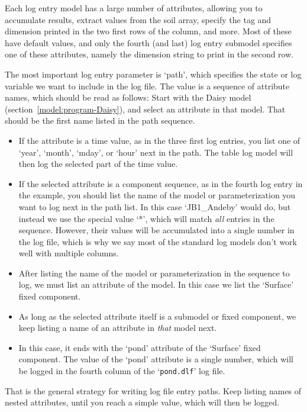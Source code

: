 Each log entry model has a large number of attributes, allowing you
to accumulate results, extract values from the soil array, specify the
tag and dimension printed in the two first rows of the column, and
more.  Most of these have default values, and only the fourth (and
last) log entry submodel specifies one of these attributes, namely the
dimension string to print in the second row.

The most important log entry parameter is `path', which specifies the
state or log variable we want to include in the log file.  The value
is a sequence of attribute names, which should be read as follows:
Start with the Daisy model (section~\ref{model:program-Daisy}), and
select an attribute in that model.  That should be the first name
listed in the path sequence.
\begin{itemize}
\item If the attribute is a time value, as in the three first log
  entries, you list one of `year', `month', `mday', or `hour' next in
  the path.  The table log model will then log the selected part of
  the time value.
\item If the selected attribute is a component sequence, as in the
  fourth log entry in the example, you should list the name of the
  model or parameterization you want to log next in the path list.  In
  this case `JB1\_Andeby' would do, but instead we use the special
  value `*', which will match \emph{all} entries in the sequence.
  However, their values will be accumulated into a single number in
  the log file, which is why we say most of the standard log models
  don't work well with multiple columns.
\item After listing the name of the model or parameterization in the
  sequence to log, we must list an attribute of the model.  In this
  case we list the `Surface' fixed component.
\item As long as the selected attribute itself is a submodel or fixed
  component, we keep listing a name of an attribute in \emph{that}
  model next.
\item In this case, it ends with the `pond' attribute of the `Surface'
  fixed component.  The value of the `pond' attribute is a single
  number, which will be logged in the fourth column of the
  `\texttt{pond.dlf}' log file.
\end{itemize}
That is the general strategy for writing log file entry paths.  Keep
listing names of nested attributes, until you reach a simple value,
which will then be logged.

